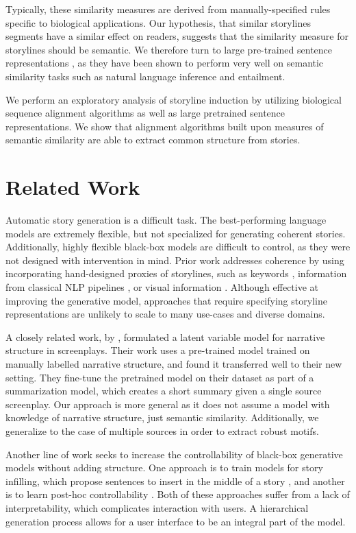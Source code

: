 \documentclass{article}
\begin{document}
Typically, these similarity measures are derived from manually-specified rules specific
to biological applications.
Our hypothesis, that similar storylines segments have a similar effect on readers,
suggests that the similarity measure for storylines should be semantic.
We therefore turn to large pre-trained sentence representations \citep{reimers2019sbert},
as they have been shown to perform very well on semantic similarity tasks such as natural language 
inference and entailment.

We perform an exploratory analysis of storyline induction by utilizing 
biological sequence alignment algorithms as well as large pretrained sentence representations.
We show that alignment algorithms built upon measures of semantic similarity 
are able to extract common structure from stories.

\section{Related Work}
Automatic story generation is a difficult task.
The best-performing language models are extremely flexible, but not specialized
for generating coherent stories.
Additionally, highly flexible black-box models are difficult to control,
as they were not designed with intervention in mind.
Prior work addresses coherence by using incorporating hand-designed proxies
of storylines, such as keywords \citep{yao2018storyline,ippolito2019rarewords},
information from classical NLP pipelines \citep{fan2019structure},
or visual information \citep{chandu2020narrative}.
Although effective at improving the generative model,
approaches that require specifying storyline representations
are unlikely to scale to many use-cases and diverse domains.

A closely related work, by \citet{papalampidi2020screenplay}, 
formulated a latent variable model for narrative structure in screenplays.
Their work uses a pre-trained model trained on manually labelled 
narrative structure, and found it transferred well to their new setting.
They fine-tune the pretrained model on their dataset as part of a 
summarization model, which creates a short summary given a single source screenplay.
Our approach is more general as it does not assume a model with knowledge of 
narrative structure, just semantic similarity.
Additionally, we generalize to the case of multiple sources in 
order to extract robust motifs.

Another line of work seeks to increase the controllability of black-box
generative models without adding structure.
One approach is to train models for story infilling,
which propose sentences to insert in the middle of a story \citep{ippolito2019infill},
and another is to learn post-hoc controllability \citep{uber2019plug}.
Both of these approaches suffer from a lack of interpretability,
which complicates interaction with users.
A hierarchical generation process allows for a user interface
to be an integral part of the model.
\end{document}
